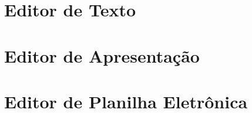 \documentclass[aspectratio=169]{beamer} %
\begin{document}
\section{Editor de Texto}

\section{Editor de Apresentação}

\section{Editor de Planilha Eletrônica}
\end{document}

